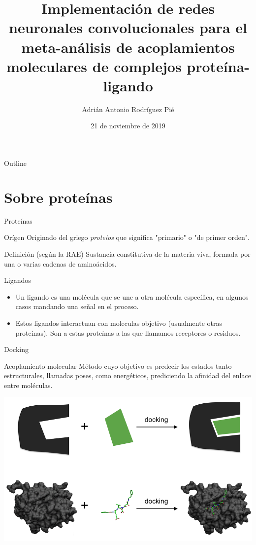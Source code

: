 \documentclass[presentation]{beamer}
\institute{Universidad Nacional Autónoma de México}
\author{Adrián Antonio Rodríguez Pié}
\date{21 de noviembre de 2019}
\title{Implementación de redes neuronales convolucionales para el meta-análisis de acoplamientos moleculares de complejos proteína-ligando}
\begin{document}
\maketitle
\begin{frame}{Outline}
\tableofcontents
\end{frame}



\section{Sobre proteínas}
\label{sec:org3dd8f81}
\begin{frame}[label={sec:org4b3872c}]{Proteínas}
\begin{block}{Orígen}
Originado del griego \emph{proteios} que significa "primario"
o "de primer orden".
\pause
\end{block}
\begin{block}{Definición (según la \alert{RAE})}
Sustancia constitutiva de la materia viva, formada
por una o varias cadenas de aminoácidos.
\end{block}
\end{frame}
\begin{frame}[label={sec:orga8db543}]{Ligandos}
\begin{itemize}
\item Un \alert{ligando} es una molécula que se une a otra molécula específica, en algunos casos mandando una señal en el proceso.
\pause
\item Estos ligandos interactuan con moleculas objetivo (usualmente otras proteínas). Son a estas proteínas a las que llamamos \alert{receptores} o \alert{residuos}.
\end{itemize}
\end{frame}
\begin{frame}[label={sec:org0f7604e}]{Docking}
\begin{block}{Acoplamiento molecular}
Método cuyo objetivo es predecir los estados tanto estructurales,
llamadas \alert{poses}, como energéticos, prediciendo la afinidad del enlace
entre moléculas.
\begin{center}
\includegraphics[width=.9\linewidth]{images/docking.png}
\end{center}
\end{block}
\end{frame}
\end{document}
